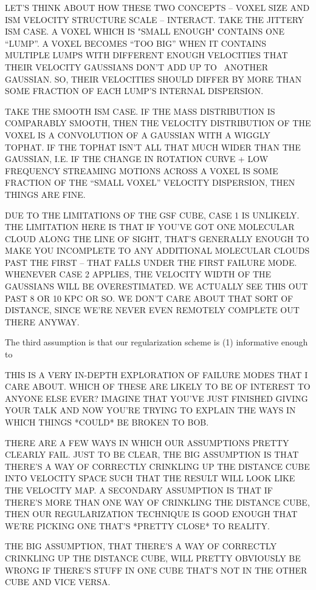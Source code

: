 LET'S THINK ABOUT HOW THESE TWO CONCEPTS -- VOXEL SIZE AND ISM VELOCITY STRUCTURE SCALE -- INTERACT. 
TAKE THE JITTERY ISM CASE. A VOXEL WHICH IS "SMALL ENOUGH" CONTAINS ONE ``LUMP''. A VOXEL BECOMES ``TOO BIG'' WHEN IT CONTAINS MULTIPLE LUMPS WITH DIFFERENT ENOUGH VELOCITIES THAT THEIR VELOCITY GAUSSIANS DON'T ADD UP TO ~ANOTHER GAUSSIAN. SO, THEIR VELOCITIES SHOULD DIFFER BY MORE THAN SOME FRACTION OF EACH LUMP'S INTERNAL DISPERSION. 

TAKE THE SMOOTH ISM CASE. IF THE MASS DISTRIBUTION IS COMPARABLY SMOOTH, THEN THE VELOCITY DISTRIBUTION OF THE VOXEL IS A CONVOLUTION OF A GAUSSIAN WITH A WIGGLY TOPHAT. IF THE TOPHAT ISN'T ALL THAT MUCH WIDER THAN THE GAUSSIAN, I.E. IF THE CHANGE IN ROTATION CURVE + LOW FREQUENCY STREAMING MOTIONS ACROSS A VOXEL IS SOME FRACTION OF THE ``SMALL VOXEL'' VELOCITY DISPERSION, THEN THINGS ARE FINE.

DUE TO THE LIMITATIONS OF THE GSF CUBE, CASE 1 IS UNLIKELY. THE LIMITATION HERE IS THAT IF YOU'VE GOT ONE MOLECULAR CLOUD ALONG THE LINE OF SIGHT, THAT'S GENERALLY ENOUGH TO MAKE YOU INCOMPLETE TO ANY ADDITIONAL MOLECULAR CLOUDS PAST THE FIRST -- THAT FALLS UNDER THE FIRST FAILURE MODE. WHENEVER CASE 2 APPLIES, THE VELOCITY WIDTH OF THE GAUSSIANS WILL BE OVERESTIMATED. WE ACTUALLY SEE THIS OUT PAST 8 OR 10 KPC OR SO. WE DON'T CARE ABOUT THAT SORT OF DISTANCE, SINCE WE'RE NEVER EVEN REMOTELY COMPLETE OUT THERE ANYWAY.

The third assumption is that our regularization scheme is (1) informative enough to 

THIS IS A VERY IN-DEPTH EXPLORATION OF FAILURE MODES THAT I CARE ABOUT. WHICH OF THESE ARE LIKELY TO BE OF INTEREST TO ANYONE ELSE EVER? IMAGINE THAT YOU'VE JUST FINISHED GIVING YOUR TALK AND NOW YOU'RE TRYING TO EXPLAIN THE WAYS IN WHICH THINGS *COULD* BE BROKEN TO BOB. 

THERE ARE A FEW WAYS IN WHICH OUR ASSUMPTIONS PRETTY CLEARLY FAIL. 
JUST TO BE CLEAR, THE BIG ASSUMPTION IS THAT THERE'S A WAY OF CORRECTLY CRINKLING UP THE DISTANCE CUBE INTO VELOCITY SPACE SUCH THAT THE RESULT WILL LOOK LIKE THE VELOCITY MAP. 
A SECONDARY ASSUMPTION IS THAT IF THERE'S MORE THAN ONE WAY OF CRINKLING THE DISTANCE CUBE, THEN OUR REGULARIZATION TECHNIQUE IS GOOD ENOUGH THAT WE'RE PICKING ONE THAT'S *PRETTY CLOSE* TO REALITY. 

THE BIG ASSUMPTION, THAT THERE'S A WAY OF CORRECTLY CRINKLING UP THE DISTANCE CUBE, WILL PRETTY OBVIOUSLY BE WRONG IF THERE'S STUFF IN ONE CUBE THAT'S NOT IN THE OTHER CUBE AND VICE VERSA. 

